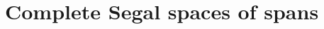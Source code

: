 \documentclass[main.tex]{subfiles}
\begin{document}
\section{Complete Segal spaces of spans}
\label{sec:complete_segal_spaces_of_spans}

%
\end{document}
